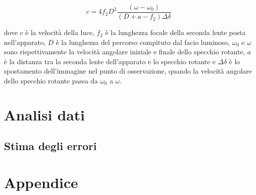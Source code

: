 \documentclass[]{article}
\let\oldsection\section%
\renewcommand{\section}{%
	\renewcommand{\theequation}{\thesection.\arabic{equation}}%
	\oldsection}%
\let\oldsubsection\subsection%
\renewcommand{\subsection}{%
	\renewcommand{\theequation}{\thesubsection.\arabic{equation}}%
	\oldsubsection}%
\begin{document}
    \begin{equation}
    \label{eqn:c}
    c=4f_2D^2
    \frac{(\omega -\omega_0)}{(D+a-f_2)\Delta \delta }
    \end{equation}

    dove $ c $ è la velocità della luce, $ f_2 $ è la lunghezza focale della seconda lente posta nell'apparato,
    $ D $ è la lunghezza del percorso compituto dal facio luminoso, $ \omega_0 $ e $ \omega $ sono rispettivamente
    la velocità angolare iniziale e finale dello specchio rotante, $ a $ è la distanza tra 
    la seconda lente dell'apparato e lo specchio rotante e $ \Delta\delta$ è lo spostamento 
    dell'immagine nel punto di osservazione, quando la velocità angolare dello specchio rotante passa da 
    $ \omega_0 $ a $ \omega $.

    \section {Analisi dati}

    \subsection {Stima degli errori}

    \section{Appendice}
\end{document}
